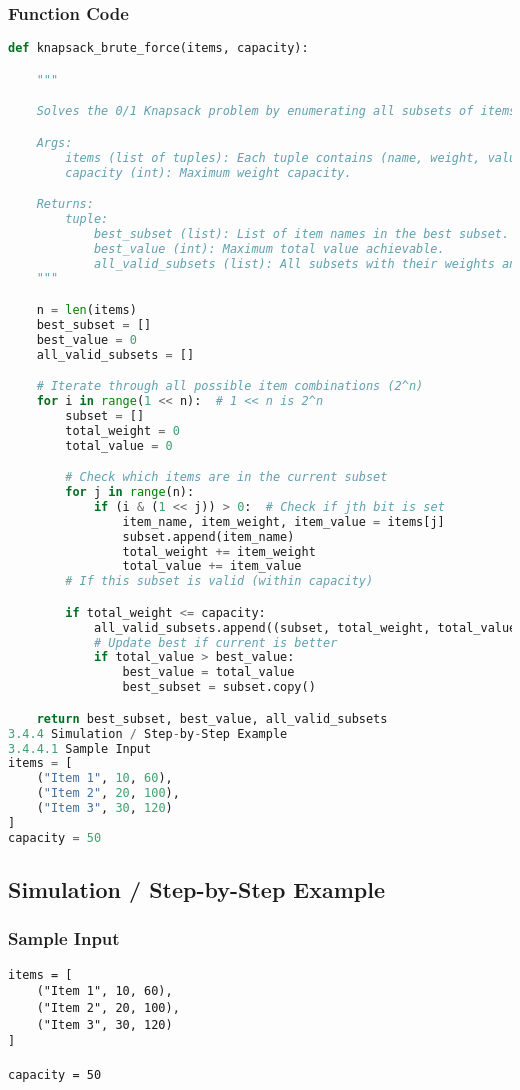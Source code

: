\documentclass{article}
\begin{document}
\subsubsection*{Function Code}
\begin{lstlisting}[language=Python]
def knapsack_brute_force(items, capacity):

    """

    Solves the 0/1 Knapsack problem by enumerating all subsets of items.

    Args:
        items (list of tuples): Each tuple contains (name, weight, value).
        capacity (int): Maximum weight capacity.

    Returns:
        tuple:
            best_subset (list): List of item names in the best subset.
            best_value (int): Maximum total value achievable.
            all_valid_subsets (list): All subsets with their weights and values.
    """

    n = len(items)
    best_subset = []
    best_value = 0
    all_valid_subsets = []

    # Iterate through all possible item combinations (2^n)
    for i in range(1 << n):  # 1 << n is 2^n
        subset = []
        total_weight = 0
        total_value = 0

        # Check which items are in the current subset
        for j in range(n):
            if (i & (1 << j)) > 0:  # Check if jth bit is set
                item_name, item_weight, item_value = items[j]
                subset.append(item_name)
                total_weight += item_weight
                total_value += item_value
        # If this subset is valid (within capacity)

        if total_weight <= capacity:
            all_valid_subsets.append((subset, total_weight, total_value))
            # Update best if current is better
            if total_value > best_value:
                best_value = total_value
                best_subset = subset.copy()

    return best_subset, best_value, all_valid_subsets
3.4.4 Simulation / Step-by-Step Example
3.4.4.1 Sample Input
items = [
    ("Item 1", 10, 60),
    ("Item 2", 20, 100),
    ("Item 3", 30, 120)
]
capacity = 50
\end{lstlisting}

\subsection*{Simulation / Step-by-Step Example}
\subsubsection*{Sample Input}
\begin{verbatim}
items = [
    ("Item 1", 10, 60),
    ("Item 2", 20, 100),
    ("Item 3", 30, 120)
]

capacity = 50
\end{verbatim}
\end{document}
